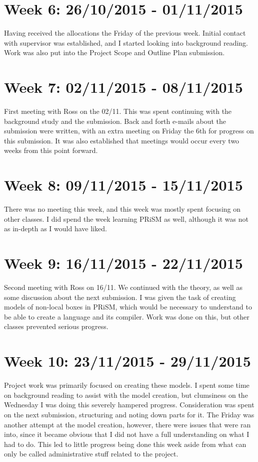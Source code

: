 \documentclass[11pt, a4paper]{article}
\begin{document}
\section{Week 6: 26/10/2015 - 01/11/2015}
Having received the allocations the Friday of the previous week. Initial
contact with supervisor was established, and I started looking into background
reading. Work was also put into the Project Scope and Outline Plan submission.

\section{Week 7: 02/11/2015 - 08/11/2015}
First meeting with Ross on the 02/11. This was spent continuing with the
background study and the submission. Back and forth e-mails about the submission
were written, with an extra meeting on Friday the 6th for progress on this
submission. It was also established that meetings would occur every two weeks
from this point forward.

\section{Week 8: 09/11/2015 - 15/11/2015}
There was no meeting this week, and this week was mostly spent focusing on other
classes. I did spend the week learning PRiSM as well, although it was not as
in-depth as I would have liked.

\section{Week 9: 16/11/2015 - 22/11/2015}
Second meeting with Ross on 16/11. We continued with the theory, as well as some
discussion about the next submission. I was given the task of creating models of
non-local boxes in PRiSM, which would be necessary to understand to be able to
create a language and its compiler. Work was done on this, but other classes
prevented serious progress.

\section{Week 10: 23/11/2015 - 29/11/2015}
Project work was primarily focused on creating these models. I spent some time
on background reading to assist with the model creation, but clumsiness on the
Wednesday I was doing this severely hampered progress. Consideration was spent
on the next submission, structuring and noting down parts for it. The Friday was
another attempt at the model creation, however, there were issues that were ran
into, since it became obvious that I did not have a full understanding on what I
had to do. This led to little progress being done this week aside from what can
only be called administrative stuff related to the project.
\end{document}
